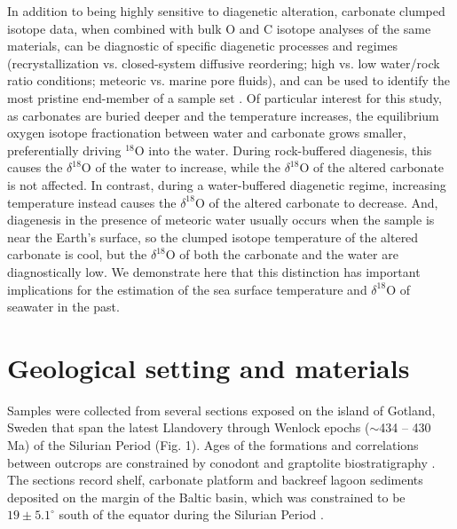 \documentclass[preprint, authoryear]{elsarticle}
\begin{document}
In addition to being highly sensitive to diagenetic alteration, carbonate clumped isotope data, when combined with bulk O and C isotope analyses of the same materials, can be diagnostic of specific diagenetic processes and regimes (recrystallization vs. closed-system diffusive reordering; high vs. low water/rock ratio conditions; meteoric vs. marine pore fluids), and can be used to identify the most pristine end-member of a sample set \citep{Eiler2011}. Of particular interest for this study, as carbonates are buried deeper and the temperature increases, the equilibrium oxygen isotope fractionation between water and carbonate grows smaller, preferentially driving $^{18}$O into the water. During rock-buffered diagenesis, this causes the $\delta^{18}$O of the water to increase, while the $\delta^{18}$O of the altered carbonate is not affected. In contrast, during a water-buffered diagenetic regime, increasing temperature instead causes the $\delta^{18}$O of the altered carbonate to decrease. And, diagenesis in the presence of meteoric water usually occurs when the sample is near the Earth's surface, so the clumped isotope temperature of the altered carbonate is cool, but the $\delta^{18}$O of both the carbonate and the water are diagnostically low. We demonstrate here that this distinction has important implications for the estimation of the sea surface temperature and $\delta^{18}$O of seawater in the past.  

\section{Geological setting and materials} 

Samples were collected from several sections exposed on the island of Gotland, Sweden that span the latest Llandovery through Wenlock epochs ($\sim$434 – 430 Ma) of the Silurian Period (Fig. 1). Ages of the formations and correlations between outcrops are constrained by conodont and graptolite biostratigraphy \citep{Jeppsson2006}. The sections record shelf, carbonate platform and backreef lagoon sediments deposited on the margin of the Baltic basin, which was constrained to be $19\pm5.1^{\circ}$ south of the equator during the Silurian Period \citep{Torsvik1992}. 
\end{document}

